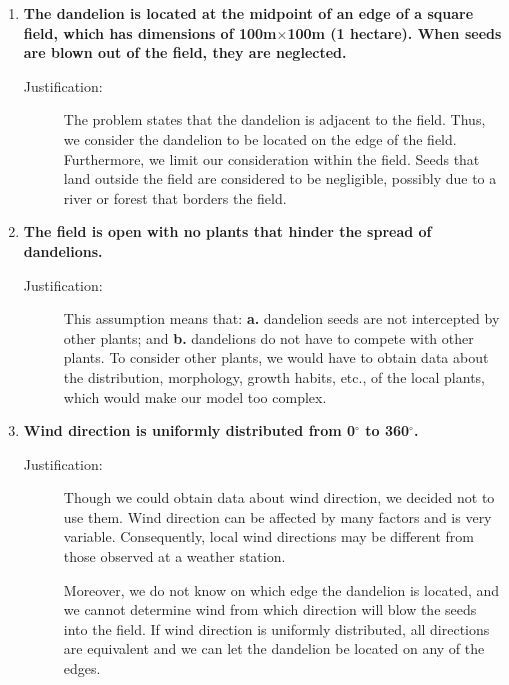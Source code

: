 \documentclass[12pt]{article}
\begin{document}
		\begin{enumerate}
			
			\item \textbf{The dandelion is located at the midpoint of an edge of a square field, which has dimensions of 100m$\times$100m (1 hectare).  When seeds are blown out of the field, they are neglected.}
			\vspace{-0.125in}
			\begin{description}
				\item[Justification:] The problem states that the dandelion is adjacent to the field.  Thus, we consider the dandelion to be located on the edge of the field.  Furthermore, we limit our consideration within the field.  Seeds that land outside the field are considered to be negligible, possibly due to a river or forest that borders the field.
			\end{description}
			
			\item \textbf{The field is open with no plants that hinder the spread of dandelions.}
			\vspace{-0.125in}
			\begin{description}
				\item[Justification:] This assumption means that: \textbf{a.} dandelion seeds are not intercepted by other plants; and \textbf{b.} dandelions do not have to compete with other plants.  To consider other plants, we would have to obtain data about the distribution, morphology, growth habits, etc., of the local plants, which would make our model too complex.
			\end{description}
			
			\item \textbf{Wind direction is uniformly distributed from 0$^\circ$ to 360$^\circ$.}
			\vspace{-0.125in}
			\begin{description}
				\item[Justification:] \label{assumption:wind} Though we could obtain data about wind direction, we decided not to use them.  Wind direction can be affected by many factors and is very variable.  Consequently, local wind directions may be different from those observed at a weather station.
				
				Moreover, we do not know on which edge the dandelion is located, and we cannot determine wind from which direction will blow the seeds into the field.  If wind direction is uniformly distributed, all directions are equivalent and we can let the dandelion be located on any of the edges.
			\end{description}
			

\end{enumerate}
\end{document}
